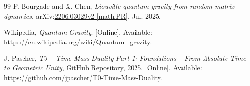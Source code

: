 \begin{thebibliography}{99}
		P. Bourgade and X. Chen,
		\emph{Liouville quantum gravity from random matrix dynamics},
		arXiv:\href{https://arxiv.org/abs/2206.03029}{2206.03029v2 [math.PR]}, Jul. 2025.
		
		Wikipedia, \emph{Quantum Gravity}.
		[Online]. Available: \href{https://en.wikipedia.org/wiki/Quantum_gravity}{https://en.wikipedia.org/wiki/Quantum\_gravity}.
		
		J. Pascher,
		\emph{T0 – Time-Mass Duality Part 1: Foundations – From Absolute Time to Geometric Unity},
		GitHub Repository, 2025.
		[Online]. Available: \href{https://github.com/jpascher/T0-Time-Mass-Duality}{https://github.com/jpascher/T0-Time-Mass-Duality}.
		
	\end{thebibliography}
	